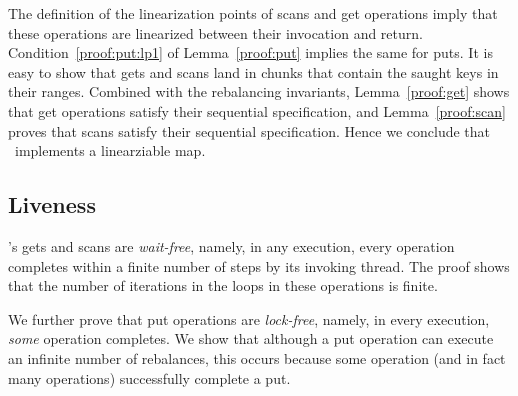The definition of the linearization points of scans and get operations imply that these operations are linearized between their invocation and return.
Condition~\ref{proof:put:lp1} of Lemma~\ref{proof:put} implies the same for puts. 
It is easy to show that gets and scans land in chunks that contain the saught keys in their ranges. Combined with the rebalancing invariants,
Lemma~\ref{proof:get} shows that get operations satisfy their sequential specification, and Lemma~\ref{proof:scan} proves that scans satisfy their sequential specification. 
Hence we conclude that \kiwi\ implements a linearziable map. 


\subsection{Liveness}
\label{sec:live}

 {\kiwi}'s gets and scans are \emph{wait-free}, namely, in any execution, every operation completes within a finite number of steps by its invoking thread. The proof shows that the number of iterations in the loops in these operations is finite. 

We further prove that put operations are \emph{lock-free}, namely, in every execution, \emph{some} operation completes. We show that although a put operation can execute an infinite number of rebalances, this occurs because 
some operation (and in fact many operations) successfully complete a put.

